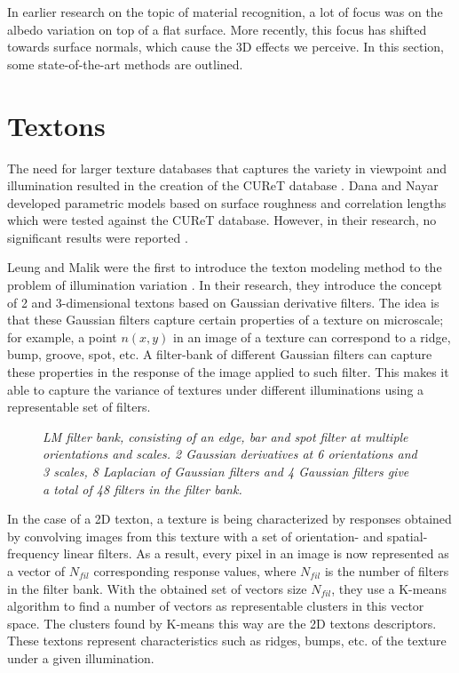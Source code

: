 \hypertarget{RelatedWork}{
}
In earlier research on the topic of material recognition, a lot of focus was on the albedo variation on top of a flat surface. More recently, this focus has shifted towards surface normals, which cause the 3D effects we perceive. In this section, some state-of-the-art methods are outlined.

\section{Textons}\label{sec:Textons}

The need for larger texture databases that captures the variety in viewpoint and illumination resulted in the creation of the CUReT database \cite{DanaNayar}. Dana and Nayar developed parametric models based on surface roughness and correlation lengths which were tested against the CUReT database. However, in their research, no significant results were reported \cite{VarmaZisserman}.

Leung and Malik were the first to introduce the texton modeling method to the problem of illumination variation \cite{LeungMalik}. In their research, they introduce the concept of 2 and 3-dimensional textons based on Gaussian derivative filters. The idea is that these Gaussian filters capture certain properties of a texture on microscale; for example, a point $n(x,y)$ in an image of a texture can correspond to a ridge, bump, groove, spot, etc. A filter-bank of different Gaussian filters can capture these properties in the response of the image applied to such filter. This makes it able to capture the variance of textures under different illuminations using a representable set of filters.

\begin{figure}[b]
	\begin{center}
	\end{center}
	\caption{\textit{LM filter bank, consisting of an edge, bar and spot filter at multiple orientations and scales. 2 Gaussian derivatives at 6 orientations and 3 scales, 8 Laplacian of Gaussian filters and 4 Gaussian filters give a total of 48 filters in the filter bank.}}
	\label{fig:LM}
\end{figure}


In the case of a 2D texton, a texture is being characterized by responses obtained by convolving images from this texture with a set of orientation- and spatial-frequency linear filters. As a result, every pixel in an image is now represented as a vector of $N_{fil}$ corresponding response values, where $N_{fil}$ is the number of filters in the filter bank. With the obtained set of vectors size $N_{fil}$, they use a K-means algorithm to find a number of vectors as representable clusters in this vector space. The clusters found by K-means this way are the 2D textons descriptors. These textons represent characteristics such as ridges, bumps, etc. of the texture under a given illumination.

